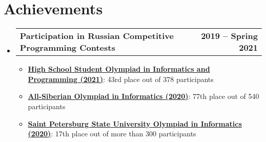 \documentclass[a4,12pt]{article}
\makeatletter
\newcommand{\resumeItem}[1]{
  \item\small{
    {#1 \vspace{-2pt}}
  }
}
\newcommand{\resumeSubheadingWithoutBottomLine}[2] {
    \vspace{-2pt}\item
    \begin{tabular*}{1.0\textwidth}[t]{l@{\extracolsep{\fill}}r}
      \textbf{#1} & \textbf{\small #2} \\
    \end{tabular*}\vspace{-7pt}
}
\newcommand{\resumeSubHeadingListStart}{\begin{itemize}[leftmargin=0.0in, label={}]}
\newcommand{\resumeSubHeadingListEnd}{\end{itemize}}
\newcommand{\resumeItemListStart}{\begin{itemize}}
\newcommand{\resumeItemListEnd}{\end{itemize}\vspace{-5pt}}
\makeatother
\begin{document}
\section{Achievements}
    \resumeSubHeadingListStart
        \resumeSubheadingWithoutBottomLine{Participation in Russian Competitive Programming Contests}{2019 -- Spring 2021}
            \resumeItemListStart
                \resumeItem{\textbf{\href{https://neerc.ifmo.ru/school/ioip/standings-2021.html}{High School Student Olympiad in Informatics and Programming (2021)}}: 43rd place out of 378 participants }
                \resumeItem{\textbf{\href{https://sesc.nsu.ru/upload/iblock/eb6/2019_3_inf_r.pdf}{All-Siberian Olympiad in Informatics (2020)}}: 77th place out of 540 participants}
                \resumeItem{\textbf{\href{http://web.archive.org/web/20200929173737/https://olympiada.spbu.ru/wp-content/uploads/info_zakl.pdf}{Saint Petersburg State University Olympiad in Informatics (2020)}}: 17th place out of more than 300 participants}

            \resumeItemListEnd
        
    \resumeSubHeadingListEnd
\end{document}
